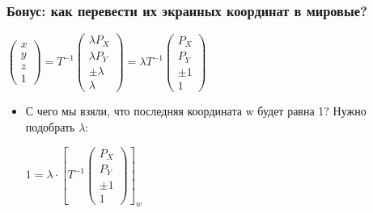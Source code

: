 \documentclass[10pt]{beamer}
\begin{document}
\begin{frame}[fragile]
\frametitle{Бонус: как перевести их экранных координат в мировые?}
\begin{center}
\begin{math}
\begin{pmatrix}x \\ y \\ z \\ 1\end{pmatrix} = T^{-1} \begin{pmatrix}\lambda P_X \\ \lambda P_Y \\ \pm \lambda \\ \lambda\end{pmatrix} = \lambda T^{-1} \begin{pmatrix}P_X \\ P_Y \\ \pm 1 \\ 1\end{pmatrix}
\end{math}
\end{center}
\pause
\begin{itemize}
\item С чего мы взяли, что последняя координата w будет равна 1? \pause Нужно подобрать \begin{math}\lambda\end{math}:
\begin{center}
\begin{math}
1 = \lambda \cdot
\left[
T^{-1} \begin{pmatrix}P_X \\ P_Y \\ \pm 1 \\ 1\end{pmatrix}
\right]_w
\end{math}
\end{center}
\end{itemize}
\end{frame}
\end{document}
